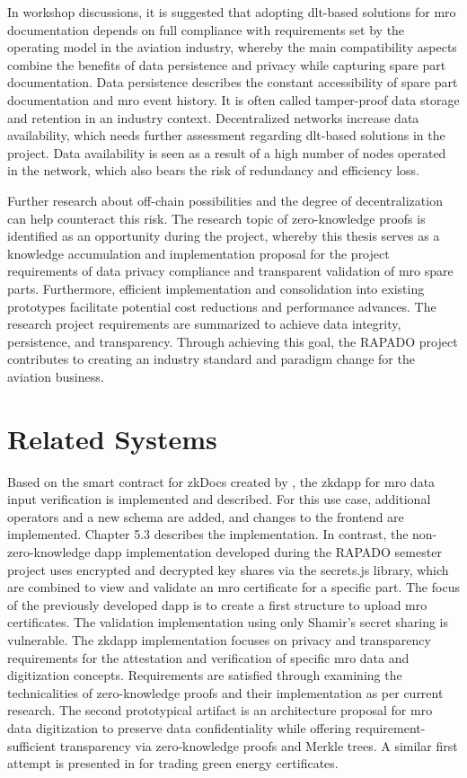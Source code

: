 In workshop discussions, it is suggested that adopting \acrshort{dlt}-based solutions for \acrshort{mro} documentation depends on full compliance with requirements set by the operating model in the aviation industry, whereby the main compatibility aspects combine the benefits of data persistence and privacy while capturing spare part documentation. Data persistence describes the constant accessibility of spare part documentation and \acrshort{mro} event history. It is often called tamper-proof data storage and retention in an industry context. Decentralized networks increase data availability, which needs further assessment regarding \acrshort{dlt}-based solutions in the project. Data availability is seen as a result of a high number of nodes operated in the network, which also bears the risk of redundancy and efficiency loss.

Further research about off-chain possibilities and the degree of decentralization can help counteract this risk. The research topic of zero-knowledge proofs is identified as an opportunity during the project, whereby this thesis serves as a knowledge accumulation and implementation proposal for the project requirements of data privacy compliance and transparent validation of \acrshort{mro} spare parts. Furthermore, efficient implementation and consolidation into existing prototypes facilitate potential cost reductions and performance advances. The research project requirements are summarized to achieve data integrity, persistence, and transparency. Through achieving this goal, the RAPADO project contributes to creating an industry standard and paradigm change for the aviation business.

\section{Related Systems}
Based on the smart contract for zkDocs created by \citet{zkdocs}, the \acrshort{zkdapp} for \acrshort{mro} data input verification is implemented and described. For this use case, additional operators and a new schema are added, and changes to the frontend are implemented. Chapter 5.3 describes the implementation. In contrast, the non-zero-knowledge \acrshort{dapp} implementation developed during the RAPADO semester project uses encrypted and decrypted key shares via the secrets.js library, which are combined to view and validate an \acrshort{mro} certificate for a specific part. The focus of the previously developed \acrshort{dapp} is to create a first structure to upload \acrshort{mro} certificates. The validation implementation using only Shamir's secret sharing is vulnerable. The \acrshort{zkdapp} implementation focuses on privacy and transparency requirements for the attestation and verification of specific \acrshort{mro} data and digitization concepts. Requirements are satisfied through examining the technicalities of zero-knowledge proofs and their implementation as per current research. The second prototypical artifact is an architecture proposal for \acrshort{mro} data digitization to preserve data confidentiality while offering requirement-sufficient transparency via zero-knowledge proofs and Merkle trees. A similar first attempt is presented in \citet{sedlemeirgrenenergy} for trading green energy certificates.